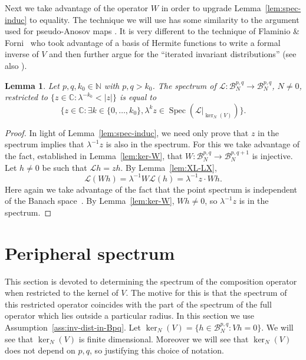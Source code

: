 \documentclass[a4paper,11pt]{amsart}
\newtheorem{lemma}[theorem]{Lemma}
\theoremstyle{remark}
\newcommand{\abs}[1]{\left|#1\right|} %
\newcommand{\cB}{\mathcal{B}} %
\newcommand{\bC}{\mathbb{C}} %
\newcommand{\cL}{\mathcal{L}} %
\newcommand{\bN}{\mathbb{N}} %
\newcommand{\dv}{V} %
\newcommand{\dw}{W} %
\newcommand{\spec}[1]{\operatorname{Spec}(#1)} %
\begin{document}
Next we take advantage of the operator \(\dw\) in order to upgrade Lemma~\ref{lem:spec-induc} to equality.
The technique we will use has some similarity to the argument used for pseudo-Anosov maps \cite{FGL19}.
It is very different to the technique of Flaminio \& Forni~\cite[A.3]{FF06} who took advantage of a basis of Hermite functions to write a formal inverse of \(\dv\) and then further argue for the ``iterated invariant distributions'' (see also \cite{Forni20}).

\begin{lemma}
    \label{lem:iterated-spec}
    Let \(p,q, k_0\in \bN\) with \(p,q > k_0\).
    The spectrum of \(\cL : \cB_{N}^{p,q} \to \cB_{N}^{p,q}\), \(N\neq 0\), restricted to \(\{z\in \bC: \lambda^{-k_0} < \abs{z}\}\) is equal to 
    \[
        \{z\in \bC : \exists k \in \{0,\ldots,k_0\}, \lambda^k z \in \spec{{\left.\cL\right|}_{\ker_N(\dv)}} \}.
    \]
\end{lemma}

\begin{proof}
    In light of Lemma~\ref{lem:spec-induc}, we need only prove that \(z\) in the spectrum implies that \(\lambda^{-1}z\) is also in the spectrum.
    For this we take advantage of the fact, established in Lemma~\ref{lem:ker-W}, that  \(\dw : \cB_{N}^{p,q} \to \cB_{N}^{p,q+1}\) is injective.
    Let \(h \neq 0\) be such that \(\cL h = z h\).
    By Lemma~\ref{lem:XL-LX},
    \[
    \cL (\dw h)=\lambda^{-1} \dw \cL (h) = \lambda^{-1} z\cdot \dw h.
    \]
    Here again we take advantage of the fact that the point spectrum is independent of the Banach space~\cite[Lemma A.1]{BT08}.
    By Lemma~\ref{lem:ker-W},  \(\dw h \neq 0\), so \(\lambda^{-1} z\) is in the spectrum.
\end{proof}


\section{Peripheral spectrum}
\label{sec:inv-dist}

This section is devoted to determining the spectrum of the composition operator when restricted to the kernel of \(\dv\).
The motive for this is that the spectrum of this restricted operator coincides with the part of the spectrum of the full operator which lies outside a particular radius.
In this section we use Assumption~\ref{ass:inv-dist-in-Bpq}.
Let $\ker_N(\dv) = \{h \in  \cB_{N}^{p,q} : \dv h = 0\}$.
We will see that $\ker_N(\dv)$ is finite dimensional.
Moreover we will see that \(\ker_N(\dv)\) does not depend on \(p,q\), so justifying this choice of notation.
\end{document}
